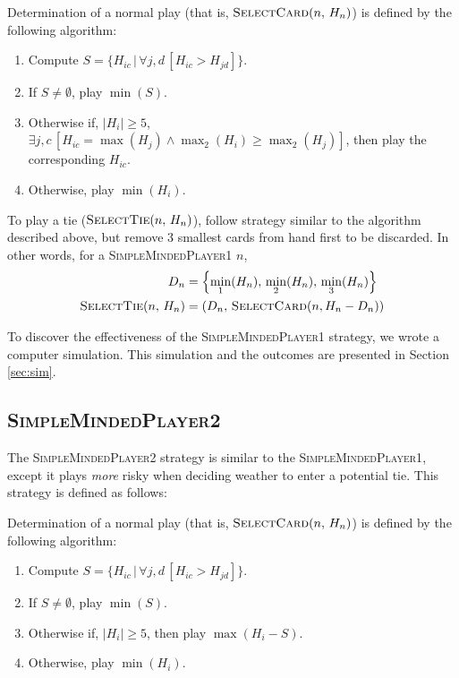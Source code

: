 \documentclass[conference]{IEEEtran}
\let\geq=\geqslant
\newcommand\SMPo{\textsc{SimpleMindedPlayer1}}
\newcommand\SMPt{\textsc{SimpleMindedPlayer2}}
\begin{document}
Determination of a normal play (that is, $\textsc{SelectCard}(n,\,H_n)$) is
defined by the following algorithm:
\begin{enumerate}
    \item Compute $S = \{H_{ic} \,|\, \forall j,d\, [H_{ic} >
        H_{jd}]\}$.
    \item If $S \ne \emptyset$, play $\min(S)$.
    \item Otherwise if, $|H_i| \geq 5$, $\exists j,c \,[H_{ic} =
        \max\left(H_{j}\right) \land \max_2\left(H_{i}\right) \geq
        \max_2\left(H_{j}\right)]$, then play the corresponding $H_{ic}$.
    \item Otherwise, play $\min\left(H_{i}\right)$.
\end{enumerate}

To play a tie ($\textsc{SelectTie}(n,\,H_n)$), follow strategy similar to the
algorithm described above, but remove 3 smallest cards from hand first to be
discarded. In other words, for a \SMPo{} $n$,
\begin{align*}
     D_n &= \left\{\min_1(H_n),\,\min_2(H_n),\,\min_3(H_n)\right\} \\
     \textsc{SelectTie}(n,\,H_n) &= \left(D_n,\,\textsc{SelectCard}(n, H_n - D_n)\right)
\end{align*}

To discover the effectiveness of the \SMPo{} strategy, we wrote a computer
simulation. This simulation and the outcomes are presented in Section
\ref{sec:sim}.

\subsection{\SMPt}
The \SMPt{} strategy is similar to the \SMPo, except it plays \emph{more} risky
when deciding weather to enter a potential tie. This strategy is defined as
follows:

Determination of a normal play (that is, $\textsc{SelectCard}(n,\,H_n)$) is
defined by the following algorithm:
\begin{enumerate}
    \item Compute $S = \{H_{ic} \,|\, \forall j,d\, [H_{ic} >
        H_{jd}]\}$.
    \item If $S \ne \emptyset$, play $\min(S)$.
    \item Otherwise if, $|H_i| \geq 5$, then play $\max(H_i - S)$.
    \item Otherwise, play $\min\left(H_{i}\right)$.
\end{enumerate}
\end{document}
